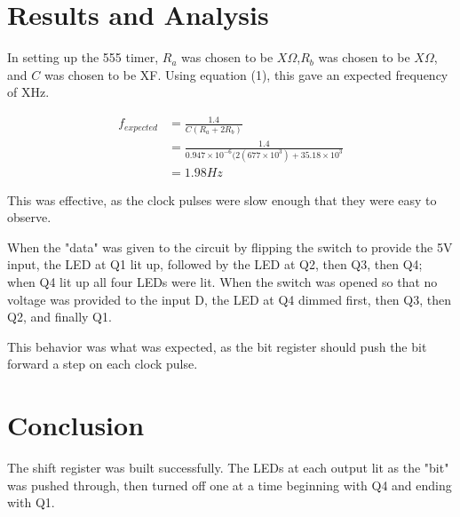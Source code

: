 \documentclass[twocolumn, amsmath]{revtex4}
\begin{document}
\section{Results and Analysis}
In setting up the 555 timer, $R_a$ was chosen to be $X \Omega$,$R_b$ was chosen to be $X \Omega$, and $C$ was chosen to be XF. Using equation (1), this gave an expected frequency of XHz.

\begin{equation*}
\begin{aligned}
f_{expected} &= \frac{1.4}{C(R_a + 2R_b)}\\ &= \frac{1.4}{0.947\times 10^{-6}(2(677\times 10^3) + 35.18\times 10^3}\\ &= 1.98 Hz
\end{aligned}
\end{equation*}

This was effective, as the clock pulses were slow enough that they were easy to observe.

When the "data" was given to the circuit by flipping the switch to provide the 5V input, the LED at Q1 lit up, followed by the LED at Q2, then Q3, then Q4; when Q4 lit up all four LEDs were lit. When the switch was opened so that no voltage was provided to the input D, the LED at Q4 dimmed first, then Q3, then Q2, and finally Q1. 

This behavior was what was expected, as the bit register should push the bit forward a step on each clock pulse.



\section{Conclusion}

The shift register was built successfully. The LEDs at each output lit as the "bit" was pushed through, then turned off one at a time beginning with Q4 and ending with Q1.
\end{document}
